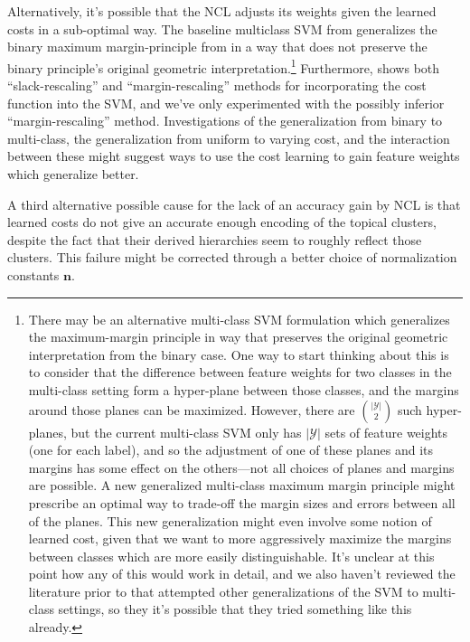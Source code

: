 \documentclass{article} %
\newcommand{\ourmethod}{NCL}
\begin{document}
Alternatively, it's possible that the \ourmethod{} adjusts its 
weights given the learned costs in a sub-optimal way.  The baseline
multiclass SVM from \citep{crammer2002algorithmic} generalizes the
binary maximum margin-principle from \citep{vapnik1998statistical}
in a way that does not preserve the binary principle's original geometric interpretation.\footnote{There may be an alternative
multi-class SVM formulation which generalizes the
 maximum-margin principle in
way that preserves the original geometric interpretation from the 
binary case.  One way to start thinking about this is to consider
that the difference between feature weights for two classes in the 
multi-class setting form a hyper-plane between those classes, and
the margins around those planes can be maximized.
However, there
are $\binom{|\mathcal{Y}|}{2}$  such hyper-planes, but the current
multi-class SVM only has
$|\mathcal{Y}|$ sets of feature weights (one for each label), and
so the adjustment of one of these planes and its margins has some
effect on the others---not all choices of planes and margins are
possible.  A new 
generalized multi-class maximum margin principle might prescribe
an optimal way to trade-off the margin sizes and errors 
between all of the planes.  This new generalization might even
involve some notion of learned cost, given that we want
to more aggressively maximize the margins between classes which
are more easily distinguishable. It's unclear at this 
point how any of this would work in detail, and we also haven't
reviewed the literature prior to \citep{crammer2002algorithmic}
that attempted other generalizations of the SVM to multi-class 
settings, so they it's possible that they tried something
like this already.
}
Furthermore, \citep{tsochantaridis2004support} shows both  
``slack-rescaling'' and ``margin-rescaling'' methods for incorporating
the cost function into the SVM, and we've only experimented with
the possibly inferior ``margin-rescaling'' method.  Investigations
of the generalization from binary to multi-class, the generalization 
from uniform to
varying cost, and the interaction between these might suggest
ways to use the cost learning to gain feature weights which generalize
better.

A third alternative possible cause for the lack of an accuracy gain by 
\ourmethod{}
is that learned costs do not give an accurate enough encoding of the
 topical clusters, despite the fact that their derived hierarchies seem
 to roughly reflect those clusters.  This failure might be corrected
 through a better choice of normalization constants $\mathbf{n}$.
\end{document}

